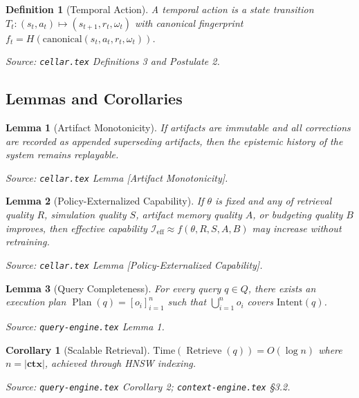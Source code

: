 \documentclass[11pt]{article}
\newtheorem{definition}{Definition}
\newtheorem{lemma}{Lemma}
\newtheorem{corollary}{Corollary}
\theoremstyle{remark}
\DeclareMathOperator{\Retrieve}{Retrieve}
\DeclareMathOperator{\Plan}{Plan}
\newcommand{\ctx}{\mathbf{ctx}}
\newcommand{\Ieff}{\mathcal{I}_{\mathrm{eff}}}
\begin{document}
\begin{definition}[Temporal Action]
A temporal action is a state transition $T_t : (s_t, a_t) \mapsto (s_{t+1}, r_t, \omega_t)$ with canonical fingerprint $f_t = H(\mathrm{canonical}(s_t, a_t, r_t, \omega_t))$.
\end{definition}

\noindent\textit{Source: \texttt{cellar.tex} Definitions 3 and Postulate 2.}

\subsection{Lemmas and Corollaries}
\label{subsec:lemmas}

\begin{lemma}[Artifact Monotonicity]
If artifacts are immutable and all corrections are recorded as appended superseding artifacts, then the epistemic history of the system remains replayable.
\end{lemma}

\noindent\textit{Source: \texttt{cellar.tex} Lemma [Artifact Monotonicity].}

\begin{lemma}[Policy-Externalized Capability]
If $\theta$ is fixed and any of retrieval quality $R$, simulation quality $S$, artifact memory quality $A$, or budgeting quality $B$ improves, then effective capability $\Ieff \approx f(\theta, R, S, A, B)$ may increase without retraining.
\end{lemma}

\noindent\textit{Source: \texttt{cellar.tex} Lemma [Policy-Externalized Capability].}

\begin{lemma}[Query Completeness]
For every query $q \in Q$, there exists an execution plan $\Plan(q) = [o_i]_{i=1}^n$ such that $\bigcup_{i=1}^n o_i$ covers $\mathrm{Intent}(q)$.
\end{lemma}

\noindent\textit{Source: \texttt{query-engine.tex} Lemma 1.}

\begin{corollary}[Scalable Retrieval]
$\mathrm{Time}(\Retrieve(q)) = O(\log n)$ where $n = |\ctx|$, achieved through HNSW indexing.
\end{corollary}

\noindent\textit{Source: \texttt{query-engine.tex} Corollary 2; \texttt{context-engine.tex} \S3.2.}

\end{document}

